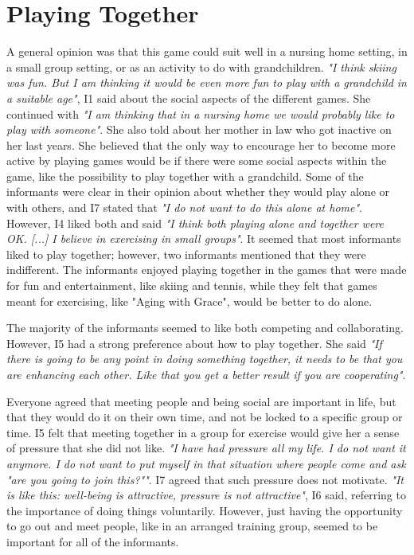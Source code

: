 \section{Playing Together}
A general opinion was that this game could suit well in a nursing home setting, in a small group setting, or as an activity to do with grandchildren. \emph{"I think skiing was fun. But I am thinking it would be even more fun to play with a grandchild in a suitable age"}, I1 said about the social aspects of the different games. She continued with \emph{"I am thinking that in a nursing home we would probably like to play with someone"}. She also told about her mother in law who got inactive on her last years. She believed that the only way to encourage her to become more active by playing games would be if there were some social aspects within the game, like the possibility to play together with a grandchild. Some of the informants were clear in their opinion about whether they would play alone or with others, and I7 stated that \emph{"I do not want to do this alone at home"}. However, I4 liked both and said \emph{"I think both playing alone and together were OK. [...] I believe in exercising in small groups"}. It seemed that most informants liked to play together; however, two informants mentioned that they were indifferent. The informants enjoyed playing together in the games that were made for fun and entertainment, like skiing and tennis, while they felt that games meant for exercising, like "Aging with Grace", would be better to do alone.  

The majority of the informants seemed to like both competing and collaborating. However, I5 had a strong preference about how to play together. She said
\emph{"If there is going to be any point in doing something together, it needs to be that you are enhancing each other. Like that you get a better result if you are cooperating"}.

Everyone agreed that meeting people and being social are important in life, but that they would do it on their own time, and not be locked to a specific group or time. I5 felt that meeting together in a group for exercise would give her a sense of pressure that she did not like. \emph{"I have had pressure all my life. I do not want it anymore. I do not want to put myself in that situation where people come and ask "are you going to join this?""}. I7 agreed that such pressure does not motivate. \emph{"It is like this: well-being is attractive, pressure is not attractive"}, I6 said, referring to the importance of doing things voluntarily. However, just having the opportunity to go out and meet people, like in an arranged training group, seemed to be important for all of the informants. 

